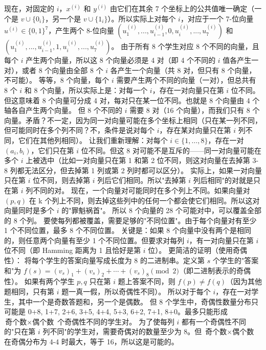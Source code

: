\documentclass[10pt,a4paper,openany]{ctexbook}
\theoremstyle{definition}
\theoremstyle{remark}
\begin{document}
现在，对固定的 $i$，$x^{(i)}$ 和 $y^{(i)}$ 由它们在其余 7 个坐标上的公共值唯一确定（一个是 $v \cup \{0_i\}$，另一个是 $v \cup \{1_i\}$）。所以实际上对每个 $i$，对应于一个 7-位向量 $u^{(i)} \in \{0,1\}^7$，产生两个 8-位向量 $(u^{(i)}_1, ..., u^{(i)}_{i-1}, 0, u^{(i)}_i, ..., u^{(i)}_7)$ 和 $(u^{(i)}_1, ..., u^{(i)}_{i-1}, 1, u^{(i)}_i, ..., u^{(i)}_7)$。
由于所有 8 个学生对应 8 个不同的向量，且每个 $i$ 产生两个向量，所以这 8 个向量必须是 4 对（即 4 个不同的 $i$ 值各产生一对），或者 8 个向量由全部 8 个 $i$ 各产生一个向量（共 8 对，但只有 8 个向量，不可能）。
等等，8 个向量，每个 $i$ 需要产生两个不同的向量（一对），但总共有 8 个 $i$ 和 8 个向量，所以实际上是：对每一个 $i$，存在一对向量只在第 $i$ 位不同。但这意味着 8 个向量可分成 4 对，每对只在某一位不同。也就是 8 个向量由 4 个轴各自产生两个向量。
但 8 个不同的 $i$ 需要 8 对（16 个向量），而我们只有 8 个向量。矛盾？不一定，因为同一对向量可能在多个坐标上相同（只在某一列不同，但可能同时在多个列不同？不，条件是说对每个 $i$，存在某对向量只在第 $i$ 列不同，它们在其他列相同）。
让我们重新理解：对每个 $i \in \{1,\dots,8\}$，存在一对 $(a_i, b_i)$，它们只在第 $i$ 位不同。但这 8 对可能不是互斥的——同一对向量可能在多个 $i$ 上被选中（比如一对向量只在第 1 和第 2 位不同，则这对向量在去掉第 3-8 列都无法区分，但去掉第 1 列或第 2 列时都可以区分）。
实际上，如果一对向量只在第 $i$ 位不同，则去掉第 $i$ 列后它们相同。所以"去掉第 $i$ 列后相同"的对就是只在第 $i$ 列不同的对。
现在，一个向量对可能同时在多个列上不同。如果向量对 $(p,q)$ 在 k 个列上不同，则去掉这些列中的任何一个都会使它们相同。所以这对向量同时是多个 $i$ 的"罪魁祸首"。
所以 8 个向量的 28 个可能对中，可以覆盖全部的 8 个列。
要使每列都被覆盖，需要足够的"不同位置"。由于每个向量对有至少 1 个不同位置，最多 8 个不同位置。
关键是：如果 8 个向量中没有两个是相同的，则任意两个向量有至少 1 个不同位置。但要求对每列 $i$，有一对向量只在第 $i$ 位不同（即 Hamming 距离为 1 且恰好是第 $i$ 位）。
更简洁的证明（使用奇偶性）：
将每个学生的答案向量写成长度为 8 的二进制串。定义第 $s$ 个学生的"答案和"为 $f(s) = (v_s)_1 + (v_s)_2 + \cdots + (v_s)_8 \pmod{2}$（即二进制表示的奇偶性）。
如果有两个学生 $p,q$ 只在第 $i$ 题上答案不同，则 $f(p) \neq f(q)$（因为其他题相同，只有第 $i$ 题一真一假，所以奇偶性不同）。
所以对于每个 $i$，存在一对学生，其中一个是奇数答题和，另一个是偶数。
但 8 个学生中，奇偶性数量分布只可能是 0+8, 1+7, 2+6, 3+5, 4+4, 5+3, 6+2, 7+1, 8+0。最多只能形成 $\text{奇个数} \times \text{偶个数}$ 个奇偶性不同的学生对。
为了使每列 $i$ 都有一个奇偶性不同的"只在第 $i$ 列不同"的学生对，需要奇偶对的数量至少为 8。但 $\text{奇个数} \times \text{偶个数}$ 在奇偶分布为 4-4 时最大，等于 16，所以这是可能的。
\end{document}
